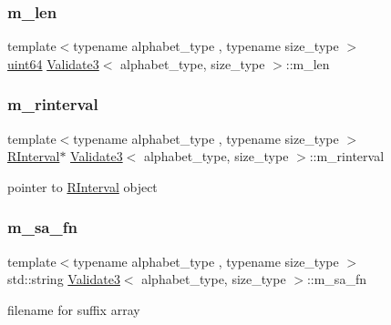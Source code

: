 \subsubsection{\texorpdfstring{m\+\_\+len}{m\_len}}
{\footnotesize\ttfamily template$<$typename alphabet\+\_\+type , typename size\+\_\+type $>$ \\
\hyperlink{types_8h_a60e8696a4678cd348e991a1f172e53f7}{uint64} \hyperlink{class_validate3}{Validate3}$<$ alphabet\+\_\+type, size\+\_\+type $>$\+::m\+\_\+len\hspace{0.3cm}{\ttfamily [private]}}

\mbox{\label{class_validate3_a70a0fb14cda49a88a90c2d426880adf0}} 
\subsubsection{\texorpdfstring{m\+\_\+rinterval}{m\_rinterval}}
{\footnotesize\ttfamily template$<$typename alphabet\+\_\+type , typename size\+\_\+type $>$ \\
\hyperlink{struct_validate3_1_1_r_interval}{R\+Interval}$\ast$ \hyperlink{class_validate3}{Validate3}$<$ alphabet\+\_\+type, size\+\_\+type $>$\+::m\+\_\+rinterval\hspace{0.3cm}{\ttfamily [private]}}



pointer to \hyperlink{struct_validate3_1_1_r_interval}{R\+Interval} object 

\mbox{\label{class_validate3_a2be6f4b53d68e4cecb67f40d73aec102}} 
\subsubsection{\texorpdfstring{m\+\_\+sa\+\_\+fn}{m\_sa\_fn}}
{\footnotesize\ttfamily template$<$typename alphabet\+\_\+type , typename size\+\_\+type $>$ \\
std\+::string \hyperlink{class_validate3}{Validate3}$<$ alphabet\+\_\+type, size\+\_\+type $>$\+::m\+\_\+sa\+\_\+fn\hspace{0.3cm}{\ttfamily [private]}}



filename for suffix array 

